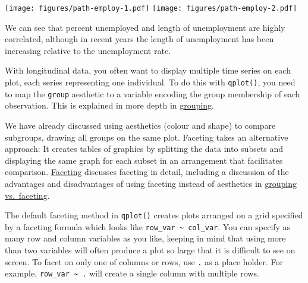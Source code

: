 \begin{Shaded}
\begin{Highlighting}[]
\StringTok{ }\StringTok{ }
\StringTok{ } 
    \NormalTok{(}\NormalTok{, }\NormalTok{))}
\StringTok{ } 
   \NormalTok{, } 
\end{Highlighting}
\end{Shaded}

\texttt{[image: figures/path-employ-1.pdf]}
\texttt{[image: figures/path-employ-2.pdf]}

We can see that percent unemployed and length of unemployment are highly
correlated, although in recent years the length of unemployment has been
increasing relative to the unemployment rate.

With longitudinal data, you often want to display multiple time series
on each plot, each series representing one individual. To do this with
\texttt{qplot()}, you need to map the \texttt{group} aesthetic to a
variable encoding the group membership of each observation. This is
explained in more depth in \hyperref[sub:grouping]{grouping}.
 


We have already discussed using aesthetics (colour and shape) to compare
subgroups, drawing all groups on the same plot. Faceting takes an
alternative approach: It creates tables of graphics by splitting the
data into subsets and displaying the same graph for each subset in an
arrangement that facilitates comparison.
\hyperref[sec:faceting]{Faceting} discusses faceting in detail,
including a discussion of the advantages and disadvantages of using
faceting instead of aesthetics in \hyperref[sub:group-vs-facet]{grouping
vs.~faceting}. 

The default faceting method in \texttt{qplot()} creates plots arranged
on a grid specified by a faceting formula which looks like
\texttt{row\_var \textasciitilde{} col\_var}. You can specify as many
row and column variables as you like, keeping in mind that using more
than two variables will often produce a plot so large that it is
difficult to see on screen. To facet on only one of columns or rows, use
\texttt{.} as a place holder. For example,
\texttt{row\_var \textasciitilde{} .} will create a single column with
multiple rows. 

